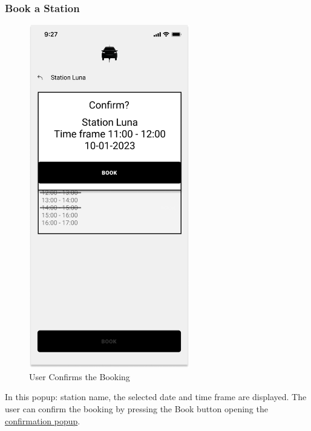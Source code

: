 \subsubsection{Book a Station}
\begin{figure}[H]
    \centering
    \includegraphics[keepaspectratio, height=15cm]{Mockup/UserAppInterface/Book Confirm.png}
    \caption{User Confirms the Booking}
    \label{pop:Booking}
\end{figure}
In this popup: station name, the selected date and time frame are displayed. The user can confirm the booking by pressing the Book button opening the \hyperref[pop:BookingConfirmed]{confirmation popup}.
